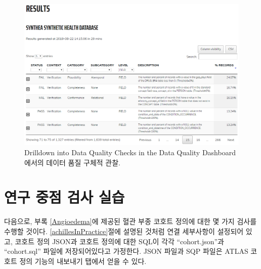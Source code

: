 \documentclass[11pt]{book}
\newenvironment{Shaded}{\begin{snugshade}}{\end{snugshade}}
\newcommand{\KeywordTok}[1]{\textcolor[rgb]{0.13,0.29,0.53}{\textbf{#1}}}
\newcommand{\DataTypeTok}[1]{\textcolor[rgb]{0.13,0.29,0.53}{#1}}
\newcommand{\StringTok}[1]{\textcolor[rgb]{0.31,0.60,0.02}{#1}}
\newcommand{\OperatorTok}[1]{\textcolor[rgb]{0.81,0.36,0.00}{\textbf{#1}}}
\newcommand{\NormalTok}[1]{#1}
\theoremstyle{definition}
\theoremstyle{definition}
\theoremstyle{definition}
\theoremstyle{remark}
\begin{document}
\begin{figure}

{\centering \includegraphics[width=1\linewidth]{images/DataQuality/dqdResults} 

}

\caption{Drilldown into Data Quality Checks in the Data Quality Dashboard 에서의 데이터 품질 구체적 관찰.}\label{fig:dqdResults}
\end{figure}

\section{연구 중점 검사 실습}\label{---}

다음으로, 부록 \ref{Angioedema}에 제공된 혈관 부종 코호트 정의에 대한 몇
가지 검사를 수행할 것이다. \ref{achillesInPractice}절에 설명된 것처럼
연결 세부사항이 설정되어 있고, 코호트 정의 JSON과 코호트 정의에 대한
SQL이 각각 ``cohort.json''과 ``cohort.sql'' 파일에 저장되어있다고
가정한다. JSON 파일과 SQP 파일은 ATLAS 코호트 정의 기능의 내보내기
탭에서 얻을 수 있다.

\begin{Shaded}
\end{Shaded}
\end{document}
